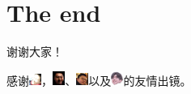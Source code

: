 \documentclass{beamer}
\begin{document}
	\section{The end}
	\begin{frame}{}
		\begin{center}
			{\Huge 谢谢大家！}
			
			\vspace{5 ex}
			
			感谢\includegraphics[width=0.4cm]{o_ji.jpg}，\includegraphics[width=0.4cm]{o_mao.png}、\includegraphics[width=0.4cm]{o_xzz.jpg}以及\includegraphics[width=0.4cm]{o_cxk.png}的友情出镜。
		\end{center}
		
		
	\end{frame}
\end{document}
